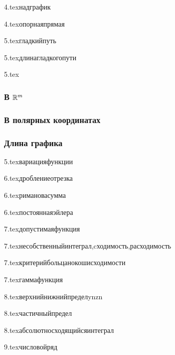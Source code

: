 {4.tex}{надграфик}

{4.tex}{опорнаяпрямая}

{5.tex}{гладкийпуть}

{5.tex}{длинагладкогопути}

{5.tex}{}
\subsubsection{В $\mathbb{R}^m$}
\subsubsection{В полярных координатах}
\subsubsection{Длина графика}

{5.tex}{вариацияфункции}

{6.tex}{дроблениеотрезка}

{6.tex}{римановасумма}

{6.tex}{постояннаяэйлера}

{7.tex}{допустимаяфункция}

{7.tex}{несобственныйинтеграл,cходимость,расходимость}

{7.tex}{критерийбольцанокошисходимости}

{7.tex}{гаммафункция}

{8.tex}{верхнийнижнийпределynzn}

{8.tex}{частичныйпредел}

{8.tex}{абсолютносходящийсяинтеграл}

{9.tex}{числовойряд}

